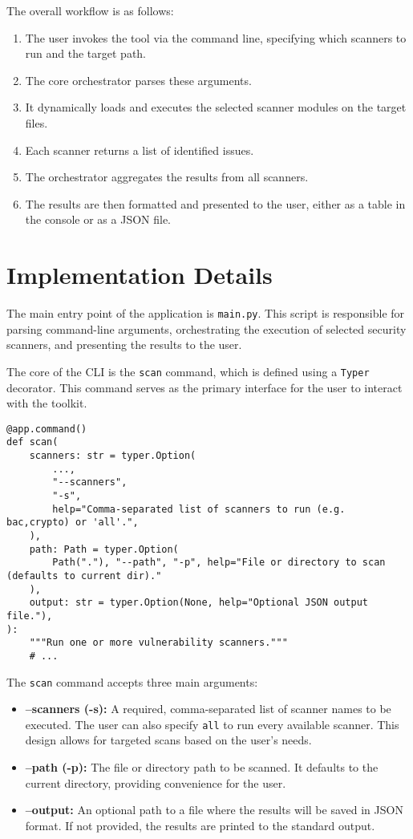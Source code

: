 The overall workflow is as follows:
\begin{enumerate}
    \item The user invokes the tool via the command line, specifying which scanners to run and the target path.
    \item The core orchestrator parses these arguments.
    \item It dynamically loads and executes the selected scanner modules on the target files.
    \item Each scanner returns a list of identified issues.
    \item The orchestrator aggregates the results from all scanners.
    \item The results are then formatted and presented to the user, either as a table in the console or as a JSON file.
\end{enumerate}

\section{Implementation Details}

The main entry point of the application is \texttt{main.py}. This script is responsible for parsing command-line arguments, orchestrating the execution of selected security scanners, and presenting the results to the user.

The core of the CLI is the \texttt{scan} command, which is defined using a \texttt{Typer} decorator. This command serves as the primary interface for the user to interact with the toolkit.

\begin{verbatim}
@app.command()
def scan(
    scanners: str = typer.Option(
        ...,
        "--scanners",
        "-s",
        help="Comma-separated list of scanners to run (e.g. bac,crypto) or 'all'.",
    ),
    path: Path = typer.Option(
        Path("."), "--path", "-p", help="File or directory to scan (defaults to current dir)."
    ),
    output: str = typer.Option(None, help="Optional JSON output file."),
):
    """Run one or more vulnerability scanners."""
    # ...
\end{verbatim}

The \texttt{scan} command accepts three main arguments:
\begin{itemize}
    \item \textbf{--scanners (-s):} A required, comma-separated list of scanner names to be executed. The user can also specify \texttt{all} to run every available scanner. This design allows for targeted scans based on the user's needs.
    \item \textbf{--path (-p):} The file or directory path to be scanned. It defaults to the current directory, providing convenience for the user.
    \item \textbf{--output:} An optional path to a file where the results will be saved in JSON format. If not provided, the results are printed to the standard output.
\end{itemize}

